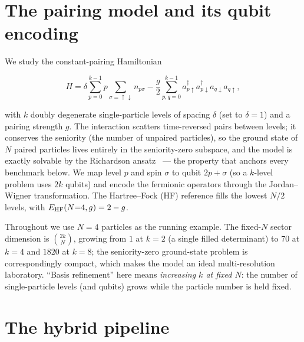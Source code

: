 \documentclass[
  aps,            %
  prc,            %
  reprint,        %
  superscriptaddress,
  floatfix,
  nofootinbib
]{revtex4-2}
\begin{document}
\section{The pairing model and its qubit encoding}
We study the constant-pairing Hamiltonian
\begin{widetext}
\begin{equation}
  H=\delta\sum_{p=0}^{k-1} p\sum_{\sigma=\uparrow\downarrow} n_{p\sigma}
   -\frac{g}{2}\sum_{p,q=0}^{k-1} a^\dagger_{p\uparrow}a^\dagger_{p\downarrow}
     a_{q\downarrow}a_{q\uparrow},
  \label{eq:H}
\end{equation}
\end{widetext}
with $k$ doubly degenerate single-particle levels of spacing $\delta$ (set to
$\delta=1$) and a pairing strength $g$.  The interaction scatters time-reversed
pairs between levels; it conserves the seniority (the number of unpaired particles),
so the ground state of $N$ paired particles lives entirely in the seniority-zero
subspace, and the model is exactly solvable by the Richardson
ansatz~\cite{Richardson1963,RichardsonSherman1964,Dukelsky2004} --- the property
that anchors every benchmark below.  We map level $p$ and spin $\sigma$ to qubit $2p+\sigma$ (so a $k$-level
problem uses $2k$ qubits) and encode the fermionic operators through the
Jordan--Wigner transformation.  The Hartree--Fock (HF) reference fills the lowest
$N/2$ levels, with $E_{\rm HF}(N{=}4,g)=2-g$.

Throughout we use $N=4$ particles as the running example.  The fixed-$N$ sector
dimension is $\binom{2k}{N}$, growing from $1$ at $k=2$ (a single filled
determinant) to $70$ at $k=4$ and $1820$ at $k=8$; the seniority-zero ground-state
problem is correspondingly compact, which makes the model an ideal multi-resolution
laboratory.  ``Basis refinement'' here means \emph{increasing $k$ at fixed $N$}: the
number of single-particle levels (and qubits) grows while the particle number is
held fixed.

\section{The hybrid pipeline}
\end{document}
